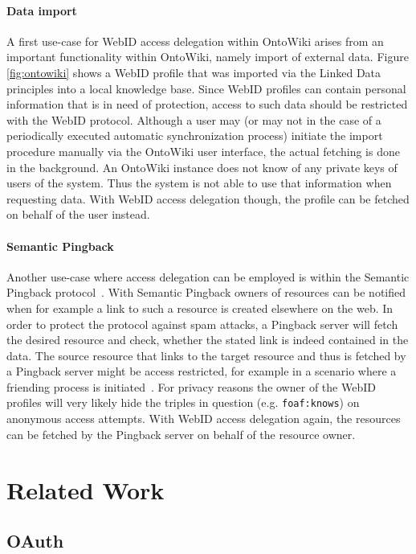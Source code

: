 \documentclass[a4paper]{llncs}
\begin{document}
\paragraph{Data import}
A first use-case for WebID access delegation within OntoWiki arises from an important functionality within OntoWiki, namely import of external data.
Figure \ref{fig:ontowiki} shows a WebID profile that was imported via the Linked Data principles into a local knowledge base.
Since WebID profiles can contain personal information that is in need of protection, access to such data should be restricted with the WebID protocol.
Although a user may (or may not in the case of a periodically executed automatic synchronization process) initiate the import procedure manually via the OntoWiki user interface, the actual fetching is done in the background.
An OntoWiki instance does not know of any private keys of users of the system.
Thus the system is not able to use that information when requesting data.
With WebID access delegation though, the profile can be fetched on behalf of the user instead.

\paragraph{Semantic Pingback}
Another use-case where access delegation can be employed is within the Semantic Pingback protocol~\cite{tramp-s-2010--b}.
With Semantic Pingback owners of resources can be notified when for example a link to such a resource is created elsewhere on the web.
In order to protect the protocol against spam attacks, a Pingback server will fetch the desired resource and check, whether the stated link is indeed contained in the data.
The source resource that links to the target resource and thus is fetched by a Pingback server might be access restricted, for example in a scenario where a friending process is initiated~\cite{story-h-2011--a}.
For privacy reasons the owner of the WebID profiles will very likely hide the triples in question (e.g. \texttt{foaf:knows}) on anonymous access attempts.
With WebID access delegation again, the resources can be fetched by the Pingback server on behalf of the resource owner.

\section{Related Work}\label{sec:relatedwork}

\subsection{OAuth}
\end{document}
